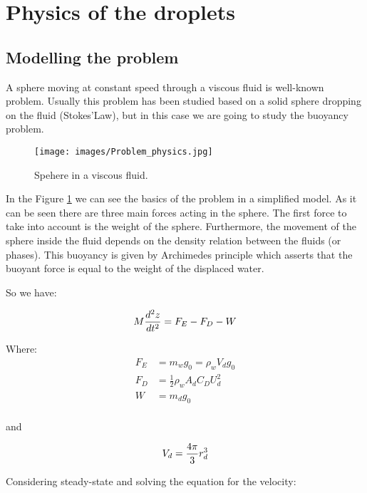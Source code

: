 \documentclass{article}
\begin{document}
\section{Physics of the droplets}

\subsection{Modelling the problem}




A sphere moving at constant speed through a viscous fluid is well-known problem. Usually this problem has been studied based on a solid sphere dropping on the fluid (Stokes'Law), but in this case we are going to study the buoyancy problem.

\begin{figure}[h!]
  \texttt{[image: images/Problem\_physics.jpg]}
  \caption{Spehere in a viscous fluid.}
  \label{fig:model_phy}
\end{figure}

In the Figure \ref{fig:model_phy}   we can see the basics of the problem in a simplified model. As it can be seen there are three main forces acting in the sphere. The first force to take into account is the weight of the sphere. Furthermore, the movement of the sphere inside the fluid depends on the density relation between the fluids (or phases). This  buoyancy  is given by Archimedes principle which asserts that the buoyant force is equal to the weight of the displaced water.


So we have:

\begin{equation}
 M\frac{d^2z}{dt^2}=F_E-F_D-W\\
\end{equation}

Where:
\begin{align}
F_E&=m_wg_0=\rho_wV_dg_0\\
F_D&=\frac{1}{2}\rho_wA_dC_DU_d^2 \\
W&=m_dg_0 \\
\end{align}

 and

\begin{equation}
V_d=\frac{4\pi}{3}r_d^3\\
\end{equation}

Considering steady-state and solving the equation for the velocity:
\end{document}
